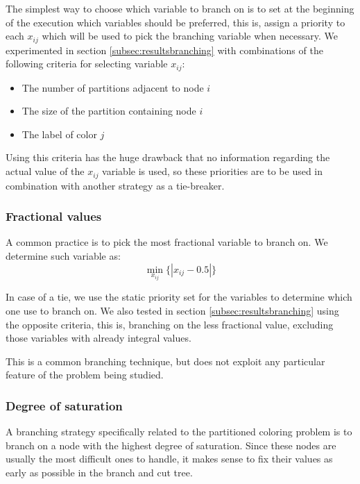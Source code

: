 The simplest way to choose which variable to branch on is to set at the beginning of the execution which variables should be preferred, this is, assign a priority to each $x_{ij}$ which will be used to pick the branching variable when necessary. We experimented in section \ref{subsec:resultsbranching} with combinations of the following criteria for selecting variable $x_{ij}$:

\begin{itemize}
\item{The number of partitions adjacent to node $i$}
\item{The size of the partition containing node $i$}
\item{The label of color $j$}
\end{itemize}

Using this criteria has the huge drawback that no information regarding the actual value of the $x_{ij}$ variable is used, so these priorities are to be used in combination with another strategy as a tie-breaker.

\subsubsection*{Fractional values}

A common practice is to pick the most fractional variable to branch on. We determine such variable as:
\[
\min_{x_{ij}} \{ |x_{ij} - 0.5| \}
\]

In case of a tie, we use the static priority set for the variables to determine which one use to branch on. We also tested in section \ref{subsec:resultsbranching} using the opposite criteria, this is, branching on the less fractional value, excluding those variables with already integral values.

This is a common branching technique, but does not exploit any particular feature of the problem being studied.

\subsubsection*{Degree of saturation}
\label{subsubsec:alg:branch:dsatur}

A branching strategy specifically related to the partitioned coloring problem is to branch on a node with the highest degree of saturation. Since these nodes are usually the most difficult ones to handle, it makes sense to fix their values as early as possible in the branch and cut tree.

